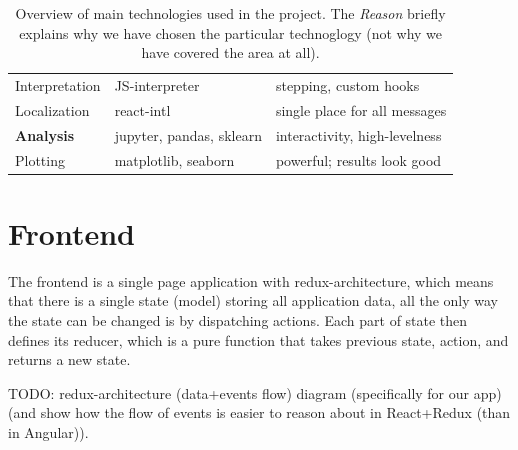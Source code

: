 \begin{table}[h]
\begin{center}
\begin{tabular}{l l l}
Interpretation & JS-interpreter & stepping, custom hooks \\
Localization & react-intl & single place for all messages \\
\hline
\textbf{Analysis} & jupyter, pandas, sklearn & interactivity, high-levelness \\
Plotting & matplotlib, seaborn & powerful; results look good \\
\bottomrule
\end{tabular}
\end{center}
\caption{%
  Overview of main technologies used in the project. %
  The \emph{Reason} briefly explains why we have chosen the particular technoglogy
  (not why we have covered the area at all).}
\label{tbl:technologies}
\end{table}

\section{Frontend}

The frontend is a single page application with redux-architecture,
which means that there is a single state (model) storing all application data,
all the only way the state can be changed is by dispatching actions.
Each part of state then defines its reducer,
which is a pure function that takes previous state, action, and returns a new state.



TODO: redux-architecture (data+events flow) diagram (specifically for our app) (and show how the flow of events is easier to reason about in React+Redux (than in Angular)).


